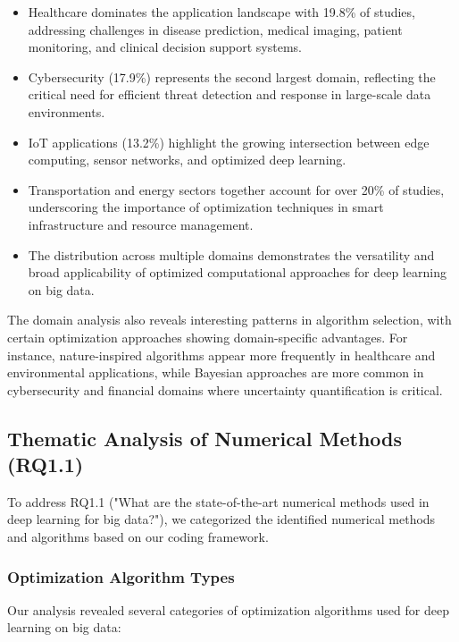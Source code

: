 \begin{itemize}
    \item Healthcare dominates the application landscape with 19.8\% of studies, addressing challenges in disease prediction, medical imaging, patient monitoring, and clinical decision support systems.
    \item Cybersecurity (17.9\%) represents the second largest domain, reflecting the critical need for efficient threat detection and response in large-scale data environments.
    \item IoT applications (13.2\%) highlight the growing intersection between edge computing, sensor networks, and optimized deep learning.
    \item Transportation and energy sectors together account for over 20\% of studies, underscoring the importance of optimization techniques in smart infrastructure and resource management.
    \item The distribution across multiple domains demonstrates the versatility and broad applicability of optimized computational approaches for deep learning on big data.
\end{itemize}

The domain analysis also reveals interesting patterns in algorithm selection, with certain optimization approaches showing domain-specific advantages. For instance, nature-inspired algorithms appear more frequently in healthcare and environmental applications, while Bayesian approaches are more common in cybersecurity and financial domains where uncertainty quantification is critical.

\subsection{Thematic Analysis of Numerical Methods (RQ1.1)}
To address RQ1.1 ("What are the state-of-the-art numerical methods used in deep learning for big data?"), we categorized the identified numerical methods and algorithms based on our coding framework. 

\subsubsection{Optimization Algorithm Types}
Our analysis revealed several categories of optimization algorithms used for deep learning on big data:

